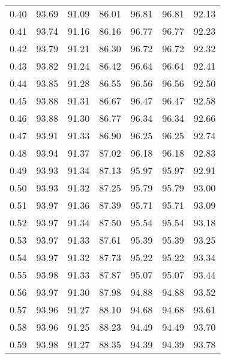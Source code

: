 \begin{tabular}{|c|c|c|c|c|c|c|}
      0.40 &     93.69 &     91.09 &      86.01 &   96.81 &      96.81 &         92.13 \\
      0.41 &     93.74 &     91.16 &      86.16 &   96.77 &      96.77 &         92.23 \\
      0.42 &     93.79 &     91.21 &      86.30 &   96.72 &      96.72 &         92.32 \\
      0.43 &     93.82 &     91.24 &      86.42 &   96.64 &      96.64 &         92.41 \\
      0.44 &     93.85 &     91.28 &      86.55 &   96.56 &      96.56 &         92.50 \\
      0.45 &     93.88 &     91.31 &      86.67 &   96.47 &      96.47 &         92.58 \\
      0.46 &     93.88 &     91.30 &      86.77 &   96.34 &      96.34 &         92.66 \\
      0.47 &     93.91 &     91.33 &      86.90 &   96.25 &      96.25 &         92.74 \\
      0.48 &     93.94 &     91.37 &      87.02 &   96.18 &      96.18 &         92.83 \\
      0.49 &     93.93 &     91.34 &      87.13 &   95.97 &      95.97 &         92.91 \\
      0.50 &     93.93 &     91.32 &      87.25 &   95.79 &      95.79 &         93.00 \\
      0.51 &     93.97 &     91.36 &      87.39 &   95.71 &      95.71 &         93.09 \\
      0.52 &     93.97 &     91.34 &      87.50 &   95.54 &      95.54 &         93.18 \\
      0.53 &     93.97 &     91.33 &      87.61 &   95.39 &      95.39 &         93.25 \\
      0.54 &     93.97 &     91.32 &      87.73 &   95.22 &      95.22 &         93.34 \\
      0.55 &     93.98 &     91.33 &      87.87 &   95.07 &      95.07 &         93.44 \\
      0.56 &     93.97 &     91.30 &      87.98 &   94.88 &      94.88 &         93.52 \\
      0.57 &     93.96 &     91.27 &      88.10 &   94.68 &      94.68 &         93.61 \\
      0.58 &     93.96 &     91.25 &      88.23 &   94.49 &      94.49 &         93.70 \\
      0.59 &     93.98 &     91.27 &      88.35 &   94.39 &      94.39 &         93.78 \\

\end{tabular}

